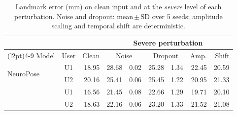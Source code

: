 \begin{table}[t]
\caption{Landmark error (mm) on clean input and at the \emph{severe} level of each perturbation. Noise and dropout: mean\,$\pm$\,SD over 5 seeds; amplitude scaling and temporal shift are deterministic.}
\label{tab:robustness}
\small\centering
\setlength{\tabcolsep}{3.3pt}
\begin{tabular}{@{}l c r r@{\,$\pm$\,}l r@{\,$\pm$\,}l r r@{}}
\toprule
 & & & \multicolumn{6}{c}{Severe perturbation} \\
\cmidrule(l{2pt}){4-9}
Model & User & Clean & \multicolumn{2}{c}{Noise} & \multicolumn{2}{c}{Dropout} & Amp. & Shift \\
\midrule
\multirow{2}{*}{NeuroPose} & U1 & 18.95 & 28.68 & 0.02 & 25.28 & 1.34 & 22.45 & 20.59 \\
 & U2 & 20.16 & 25.41 & 0.06 & 25.45 & 1.22 & 20.95 & 21.33 \\
\addlinespace[2pt]
\multirow{2}{*}{vemg2pose} & U1 & 16.56 & 21.45 & 0.08 & 22.66 & 1.29 & 19.71 & 20.10 \\
 & U2 & 18.63 & 22.16 & 0.06 & 23.20 & 1.33 & 21.52 & 21.08 \\
\bottomrule
\end{tabular}
\end{table}
